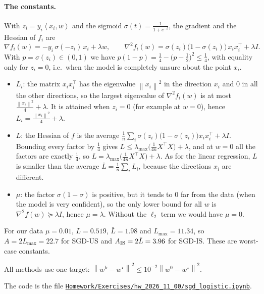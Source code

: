 \documentclass[11pt,a4paper]{article}
\newcommand{\norm}[1]{\left\| #1 \right\|}
\newcommand{\ip}[2]{\left\langle #1, #2 \right\rangle}
\begin{document}
\paragraph{The constants.} With $z_i = y_i\ip{x_i}{w}$ and the sigmoid $\sigma(t) = \frac{1}{1+e^{-t}}$, the gradient
and the Hessian of $f_i$ are
\[
  \nabla f_i(w) = -y_i\,\sigma(-z_i)\,x_i + \lambda w, \qquad
  \nabla^2 f_i(w) = \sigma(z_i)\bigl(1 - \sigma(z_i)\bigr)\,x_ix_i^\top + \lambda I .
\]
With $p = \sigma(z_i) \in (0,1)$ we have
$p(1-p) = \frac{1}{4} - \bigl(p - \frac{1}{2}\bigr)^2 \le \frac{1}{4}$, with equality only for $z_i = 0$, i.e.\ when the
model is completely unsure about the point $x_i$.
\begin{itemize}
  \item $L_i$: the matrix $x_ix_i^\top$ has the eigenvalue $\norm{x_i}^2$ in the direction $x_i$ and $0$ in all the
    other directions, so the largest eigenvalue of $\nabla^2 f_i(w)$ is at most $\frac{\norm{x_i}^2}{4} + \lambda$.
    It is attained when $z_i = 0$ (for example at $w = 0$), hence $L_i = \frac{\norm{x_i}^2}{4} + \lambda$.
  \item $L$: the Hessian of $f$ is the average $\frac{1}{n}\sum_i \sigma(z_i)\bigl(1-\sigma(z_i)\bigr)x_ix_i^\top + \lambda I$.
    Bounding every factor by $\frac{1}{4}$ gives $L \le \lambda_{\max}\bigl(\frac{1}{4n}X^\top X\bigr) + \lambda$, and at
    $w = 0$ all the factors are exactly $\frac{1}{4}$, so $L = \lambda_{\max}\bigl(\frac{1}{4n}X^\top X\bigr) + \lambda$.
    As for the linear regression, $L$ is smaller than the average $\bar L = \frac{1}{n}\sum_i L_i$, because the
    directions $x_i$ are different.
  \item $\mu$: the factor $\sigma(1-\sigma)$ is positive, but it tends to $0$ far from the data (when the model is
    very confident), so the only lower bound for all $w$ is $\nabla^2 f(w) \succeq \lambda I$, hence $\mu = \lambda$.
    Without the $\ell_2$ term we would have $\mu = 0$.
\end{itemize}
For our data $\mu = 0.01$, $L = 0.519$, $\bar L = 1.98$ and $L_{\max} = 11.34$, so $A = 2L_{\max} = 22.7$ for SGD-US
and $A_{\rm IS} = 2\bar L = 3.96$ for SGD-IS. These are worst-case constants.

All methods use one target: $\norm{w^k - w^\star}^2 \le 10^{-2}\norm{w^0 - w^\star}^2$.

The code is the file
\href{https://github.com/Gor-2001/thesis_hw/blob/main/Homework/Exercises/hw_2026_11_00/sgd_logistic.ipynb}{\texttt{Homework/Exercises/hw\_2026\_11\_00/sgd\_logistic.ipynb}}.
\end{document}
